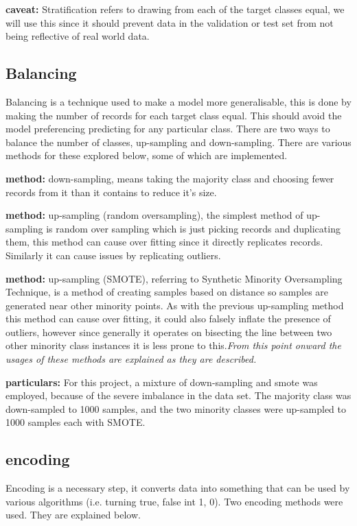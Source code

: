 \documentclass[a4paper]{article}
\begin{document}
\textbf{caveat:} Stratification refers to drawing from each of the target classes equal, we will use this since it should prevent data in the validation or test set from not being reflective of real world data.  

\subsection{Balancing}

Balancing is a technique used to make a model more generalisable, this is done by making the number of records for each target class equal. This should avoid the model preferencing predicting for any particular class. There are two ways to balance the number of classes, up-sampling and down-sampling. There are various methods for these explored below, some of which are implemented.

\textbf{method:} down-sampling, means taking the majority class and choosing fewer records from it than it contains to reduce it's size.

\textbf{method:} up-sampling (random oversampling), the simplest method of up-sampling is random over sampling which is just picking records and duplicating them, this method can cause over fitting since it directly replicates records. Similarly it can cause issues by replicating outliers.

\textbf{method:} up-sampling (SMOTE), referring to Synthetic Minority Oversampling Technique, is a method of creating samples based on distance so samples are generated near other minority points. As with the previous up-sampling method this method can cause over fitting, it could also falsely inflate the presence of outliers, however since generally it operates on bisecting the line between two other minority class instances it is less prone to this.\textit{From this point onward the usages of these methods are explained as they are described.}

\textbf{particulars:} For this project, a mixture of down-sampling and smote was employed, because of the severe imbalance in the data set. The majority class was down-sampled to 1000 samples, and the two minority classes were up-sampled to 1000 samples each with SMOTE.

\subsection{encoding}
Encoding is a necessary step, it converts data into something that can be used by various algorithms (i.e. turning true, false int 1, 0). Two encoding methods were used. They are explained below.
\end{document}
